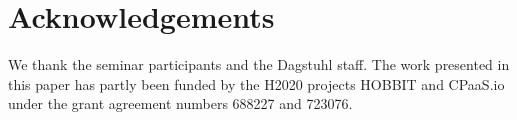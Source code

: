 \section*{Acknowledgements}
We thank the seminar participants and the Dagstuhl staff.
The work presented in this paper has partly been funded by the H2020 projects HOBBIT and CPaaS.io under the grant agreement numbers 688227 and 723076.

